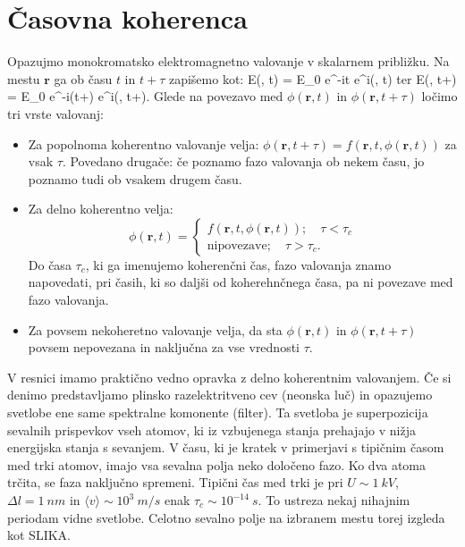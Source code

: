 \section{Časovna koherenca}
Opazujmo monokromatsko elektromagnetno valovanje v skalarnem približku. Na mestu $\mathbf{r}$
ga ob času $t$ in $t+\tau$ zapišemo kot:
\beq
E(, t) = E_0 e^{-i\omega t} e^{i\phi(, t)}
\eeq
ter
\beq
E(, t+\tau) = E_0 e^{-i\omega (t+\tau)} e^{i\phi(, t+\tau)}.
\eeq
Glede na povezavo med $\phi(\mathbf{r}, t)$ in $\phi(\mathbf{r}, t+\tau)$ ločimo tri vrste valovanj:
\begin{itemize}
 \item Za popolnoma koherentno valovanje velja: $\phi(\mathbf{r}, t+\tau) = f(\mathbf{r}, t, \phi(\mathbf{r}, t))$
 za vsak $\tau$. Povedano drugače: če poznamo fazo valovanja ob nekem času, jo poznamo tudi ob vsakem drugem času.
 \item Za delno koherentno velja:
\begin{equation}
\phi(\mathbf{r}, t)=\begin{cases}
f(\mathbf{r}, t, \phi(\mathbf{r}, t)); \quad \tau < \tau_c\\
\mathrm{ni povezave}; \quad \tau > \tau_c.
\end{cases}
\label{eq:gauss-eksponent}
\end{equation}
Do časa $\tau_c$, ki ga imenujemo koherenčni čas, fazo valovanja znamo napovedati, pri časih, ki so daljši
od koherehnčnega časa, pa ni povezave med fazo valovanja.
 \item Za povsem nekoheretno valovanje velja, da sta $\phi(\mathbf{r}, t)$ in $\phi(\mathbf{r}, t+\tau)$
 povsem nepovezana in naključna za vse vrednosti $\tau$.
\end{itemize}
V resnici imamo praktično vedno opravka z delno koherentnim valovanjem. Če si denimo predstavljamo
plinsko razelektritveno cev (neonska luč) in opazujemo svetlobe ene same spektralne komonente (filter).
Ta svetloba je superpozicija sevalnih prispevkov vseh atomov, ki iz vzbujenega stanja prehajajo v nižja
energijska stanja s sevanjem. V času, ki je kratek v primerjavi s tipičnim časom med trki atomov,
imajo vsa sevalna polja neko določeno fazo. Ko dva atoma trčita, se faza naključno spremeni. Tipični 
čas med trki je pri $U \sim 1~\si{kV}$, $\Delta l = 1~\si{nm}$ in $\langle v \rangle \sim 10^3~\si{m/s}$
enak $\tau_c \sim 10^{-14}~\si{s}$. To ustreza nekaj nihajnim periodam vidne svetlobe. Celotno sevalno 
polje na izbranem mestu torej izgleda kot SLIKA.

